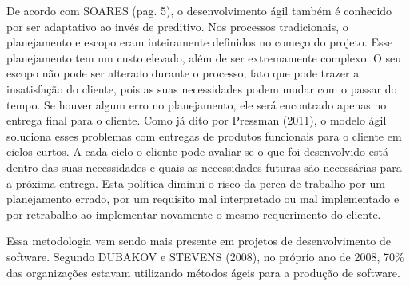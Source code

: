 De acordo com SOARES (pag. 5), o desenvolvimento ágil também é conhecido por ser adaptativo ao invés de preditivo. Nos processos tradicionais, o planejamento e escopo eram inteiramente definidos no começo do projeto. Esse planejamento tem um custo elevado, além de ser extremamente complexo. O seu escopo não pode ser alterado durante o processo, fato que pode trazer a insatisfação do cliente, pois as suas necessidades podem mudar com o passar do tempo. Se houver algum erro no planejamento, ele será encontrado apenas no entrega final para o cliente. Como já dito por Pressman (2011), o modelo ágil soluciona esses problemas com entregas de produtos funcionais para o cliente em ciclos curtos. A cada ciclo o cliente pode avaliar se o que foi desenvolvido está dentro das suas necessidades e quais as necessidades futuras são necessárias para a próxima entrega. Esta política diminui o risco da perca de trabalho por um planejamento errado, por um requisito mal interpretado ou mal implementado e por retrabalho ao implementar novamente o mesmo requerimento do cliente.

Essa metodologia vem sendo mais presente em projetos de desenvolvimento de software. Segundo DUBAKOV e STEVENS (2008), no próprio ano de 2008, 70\% das organizações estavam utilizando métodos ágeis para a produção de software.
